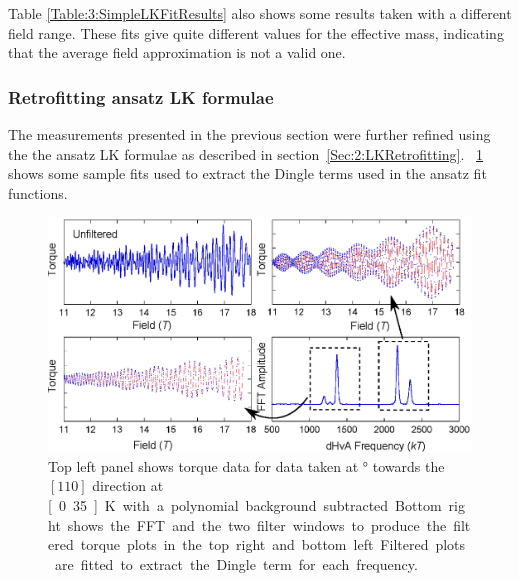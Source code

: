 Table \ref{Table:3:SimpleLKFitResults} also shows some results taken with a different field range. These fits give quite different values for the effective mass, indicating that the average field approximation is not a valid one.

\subsubsection{Retrofitting ansatz LK formulae}

The measurements presented in the previous section were further refined using the the ansatz LK formulae as described in section~\ref{Sec:2:LKRetrofitting}. \Fig~\ref{Fig:3:DingleTermExtractionFits} shows some sample fits used to extract the Dingle terms used in the ansatz fit functions.
\begin{figure}[h!]
    \begin{center}
        \includegraphics[scale=0.7]{Chapter3-dHvABaFe2P2/Figures/Mass/FittingDingleTerm/FittingDingleTerm}
        \caption{Top left panel shows torque data for data taken at \unit[12]{\degree} towards the $[110]$ direction at \unit[0.35]{K} with a polynomial background subtracted. Bottom right shows the FFT and the two filter windows to produce the filtered torque plots in the top right and bottom left. Filtered plots are fitted to extract the Dingle term for each frequency.}
        \label{Fig:3:DingleTermExtractionFits}
    \end{center}
\end{figure}

